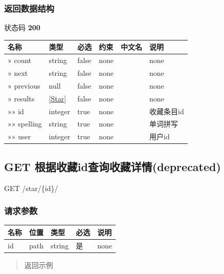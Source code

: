 \documentclass[
]{article}
\begin{document}
\hypertarget{ux8fd4ux56deux6570ux636eux7ed3ux6784-24}{%
\subsubsection{返回数据结构}\label{ux8fd4ux56deux6570ux636eux7ed3ux6784-24}}

状态码 \textbf{200}

\begin{longtable}[]{@{}llllll@{}}
\toprule
名称 & 类型 & 必选 & 约束 & 中文名 & 说明 \\
\midrule
\endhead
» count & string & false & none & & none \\
» next & string & false & none & & none \\
» previous & null & false & none & & none \\
» results & {[}\protect\hyperlink{schemastar}{Star}{]} & false & none &
& none \\
»» id & integer & true & none & & 收藏条目id \\
»» spelling & string & true & none & & 单词拼写 \\
»» user & integer & true & none & & 用户id \\
\bottomrule
\end{longtable}

\hypertarget{get-ux6839ux636eux6536ux85cfidux67e5ux8be2ux6536ux85cfux8be6ux60c5deprecated}{%
\subsection{GET
根据收藏id查询收藏详情(deprecated)}\label{get-ux6839ux636eux6536ux85cfidux67e5ux8be2ux6536ux85cfux8be6ux60c5deprecated}}

GET /star/\{id\}/

\hypertarget{ux8bf7ux6c42ux53c2ux6570-29}{%
\subsubsection{请求参数}\label{ux8bf7ux6c42ux53c2ux6570-29}}

\begin{longtable}[]{@{}lllll@{}}
\toprule
名称 & 位置 & 类型 & 必选 & 说明 \\
\midrule
\endhead
id & path & string & 是 & none \\
\bottomrule
\end{longtable}

\begin{quote}
返回示例
\end{quote}
\end{document}
